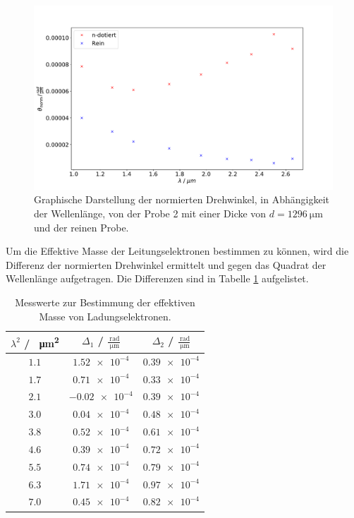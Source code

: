\begin{figure}
  \centering
  \includegraphics[width = \textwidth,keepaspectratio]{figure/Theta2_plot.pdf}
  \caption{Graphische Darstellung der normierten Drehwinkel, in Abhängigkeit der Wellenlänge, von der Probe 2 mit einer Dicke von $d=\SI{1296}{\micro\meter}$ und 
  der reinen Probe.}
  \label{fig:Drehwinkel_2}
\end{figure}
\FloatBarrier
Um die  Effektive Masse der Leitungselektronen bestimmen zu können, wird die Differenz der normierten Drehwinkel ermittelt
und gegen das Quadrat der Wellenlänge aufgetragen. Die Differenzen sind in Tabelle \ref{tab:Differenzen} aufgelistet.
\FloatBarrier
\begin{table}
  \centering
  \begin{tabular}{c c c}
    \toprule
    $\lambda^2$ / \SI{}{\square\micro\meter}&$\Delta_{\text{1}}$ / $\frac{\SI{}{\radian}}{\SI{}{\micro\meter}}$&$\Delta_{\text{2}}$ / $\frac{\SI{}{\radian}}{\SI{}{\micro\meter}}$\\
    \midrule 
    $\num{1.1}$&$\num{1.52e-4}$&$ \num{0.39e-4}$\\
    $\num{1.7}$&$\num{0.71e-4}$&$ \num{0.33e-4}$\\
    $\num{2.1}$&$\num{-0.02e-4}$&$\num{0.39e-4}$\\
    $\num{3.0}$&$\num{0.04e-4}$&$ \num{0.48e-4}$\\
    $\num{3.8}$&$\num{0.52e-4}$&$ \num{0.61e-4}$\\
    $\num{4.6}$&$\num{0.39e-4}$&$ \num{0.72e-4}$\\
    $\num{5.5}$&$\num{0.74e-4}$&$ \num{0.79e-4}$\\
    $\num{6.3}$&$\num{1.71e-4}$&$ \num{0.97e-4}$\\
    $\num{7.0}$&$\num{0.45e-4}$&$  \num{0.82e-4}$\\
    \bottomrule
  \end{tabular}
  \caption{Messwerte zur Bestimmung der effektiven Masse von Ladungselektronen.}
  \label{tab:Differenzen}
\end{table}
